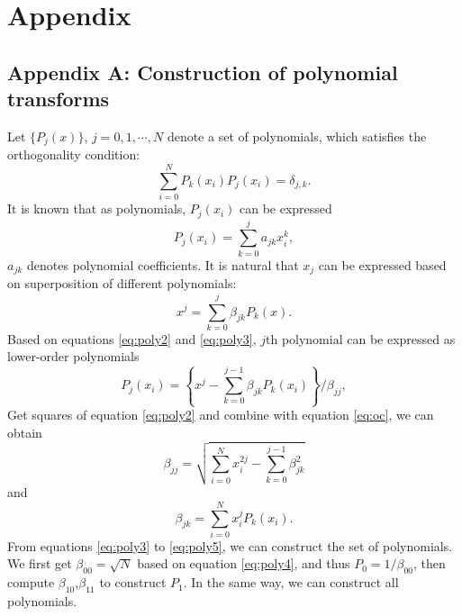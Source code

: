 \section{Appendix}
\subsection{Appendix A: Construction of polynomial transforms}
Let $\{P_j(x)\}$, $j=0,1,\cdots,N$ denote a set of polynomials, which satisfies the orthogonality condition:
\begin{equation}
\label{eq:oc}
\sum_{i=0}^{N} P_k(x_i)P_j(x_i) = \delta_{j,k}.
\end{equation}
It is known that as polynomials, $P_j(x_i)$ can be expressed
\begin{equation}
\label{eq:poly}
P_j(x_i) = \sum_{k=0}^j a_{jk}x_i^k,
\end{equation}
$a_{jk}$ denotes polynomial coefficients. It is natural that $x_j$ can be expressed based on superposition of different polynomials:
\begin{equation}
\label{eq:poly2}
x^j = \sum_{k=0}^j \beta_{jk} P_k(x).
\end{equation}
Based on equations \ref{eq:poly2} and \ref{eq:poly3}, $j$th polynomial can be expressed as lower-order polynomials
\begin{equation}
\label{eq:poly3}
P_j(x_i) = \left\{ x^j - \sum_{k=0}^{j-1}\beta_{jk}P_k(x_i) \right\}/\beta_{jj},
\end{equation}
Get squares of equation \ref{eq:poly2} and combine with equation \ref{eq:oc}, we can obtain
\begin{equation}
\label{eq:poly4}
\beta_{jj} = \sqrt{\sum_{i=0}^{N} x_i^{2j} -\sum_{k=0}^{j-1}\beta_{jk}^2}
\end{equation}
and 
\begin{equation}
\label{eq:poly5}
\beta_{jk} = \sum_{i=0}^{N} x_i^j P_k(x_i).
\end{equation}
From equations \ref{eq:poly3} to \ref{eq:poly5}, we can construct the set of polynomials. We first get $\beta_{00}=\sqrt{N}$ based on equation \ref{eq:poly4}, and thus $P_0=1/\beta_{00}$, then compute $\beta_{10}$,$\beta_{11}$ to construct $P_1$. In the same way, we can construct all polynomials.


